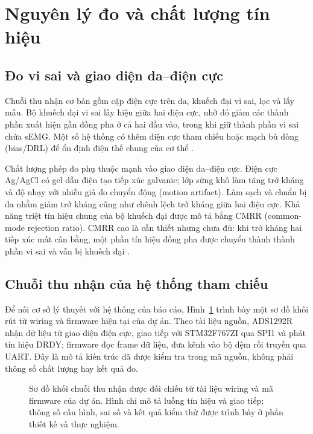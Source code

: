 \section{Nguyên lý đo và chất lượng tín hiệu}
\label{sec:measurement}

\subsection{Đo vi sai và giao diện da--điện cực}
\label{sec:differential-measurement}

Chuỗi thu nhận cơ bản gồm cặp điện cực trên da, khuếch đại vi sai, lọc và
lấy mẫu. Bộ khuếch đại vi sai lấy hiệu giữa hai điện cực, nhờ đó giảm các
thành phần xuất hiện gần đồng pha ở cả hai đầu vào, trong khi giữ thành
phần vi sai chứa sEMG. Một số hệ thống có thêm điện cực tham chiếu hoặc
mạch bù dòng (bias/DRL) để ổn định điện thế chung của cơ thể
\cite{boyer2023reducing,mcmanus2020analysis,rafael2019development}.

Chất lượng phép đo phụ thuộc mạnh vào giao diện da--điện cực. Điện cực
Ag/AgCl có gel dẫn điện tạo tiếp xúc galvanic; lớp sừng khô làm tăng trở
kháng và độ nhạy với nhiễu giả do chuyển động (motion artifact). Làm sạch
và chuẩn bị da nhằm giảm trở kháng cũng như chênh lệch trở kháng giữa hai
điện cực. Khả năng triệt tín hiệu chung của bộ khuếch đại được mô tả bằng
CMRR (common-mode rejection ratio). CMRR cao là cần thiết nhưng chưa đủ:
khi trở kháng hai tiếp xúc mất cân bằng, một phần tín hiệu đồng pha được
chuyển thành thành phần vi sai và vẫn bị khuếch đại
\cite{hermens2000development,boyer2023reducing}.

\subsection{Chuỗi thu nhận của hệ thống tham chiếu}
\label{sec:project-acquisition-chain}

Để nối cơ sở lý thuyết với hệ thống của báo cáo, Hình~\ref{fig:acquisition-chain}
trình bày một sơ đồ khối rút từ wiring và firmware hiện tại của dự án.
Theo tài liệu nguồn, ADS1292R nhận dữ liệu từ giao diện điện cực, giao tiếp
với STM32F767ZI qua SPI1 và phát tín hiệu DRDY; firmware đọc frame dữ liệu,
đưa kênh vào bộ đệm rồi truyền qua UART. Đây là mô tả kiến trúc đã được
kiểm tra trong mã nguồn, không phải thông số chất lượng hay kết quả đo.

\begin{figure}[htbp]
    \centering
    \resizebox{\textwidth}{!}{}
    \caption{Sơ đồ khối chuỗi thu nhận được đối chiếu từ tài liệu wiring và
    mã firmware của dự án. Hình chỉ mô tả luồng tín hiệu và giao tiếp;
    thông số cấu hình, sai số và kết quả kiểm thử được trình bày ở phần
    thiết kế và thực nghiệm.}
    \label{fig:acquisition-chain}
\end{figure}

